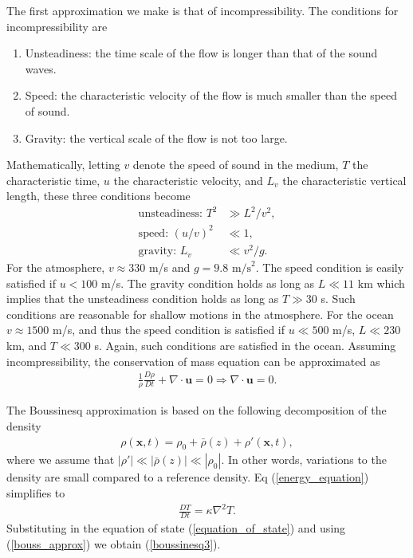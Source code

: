 The first approximation we make is that of incompressibility. The conditions for incompressibility are \cite{batchelor,kundu,waitecnotes}
\begin{enumerate}
\item Unsteadiness: the time scale of the flow is longer than that of the sound waves.
\item Speed: the characteristic velocity of the flow is much smaller than the speed of sound.
\item Gravity: the vertical scale of the flow is not too large.
\end{enumerate}
Mathematically, letting $v$ denote the speed of sound in the medium, $T$ the characteristic time, $u$ the characteristic velocity, and $L_{v}$ the characteristic vertical length, these three conditions become \cite{waitecnotes}
\begin{align}
\text{unsteadiness: } T^{2} &\gg L^{2}/v^{2},\\
\text{speed: } (u/v)^{2} &\ll 1,\\
\text{gravity: } L_{v}&\ll v^{2}/g.
\end{align} 
For the atmosphere, $v\approx 330$ m/s and $g=9.8 \text{ m/s}^{2}$. The speed condition is easily satisfied if $u< 100$ m/s. The gravity condition holds as long as $L\ll 11 \text{ km}$ which implies that the unsteadiness condition holds as long as $T\gg 30$ s. Such conditions are reasonable for shallow motions in the atmosphere. For the ocean $v\approx 1500$ m/s, and thus the speed condition is satisfied if $u\ll500$ m/s, $L\ll230$ km, and $T\ll300$ s. Again, such conditions are satisfied in the ocean. Assuming incompressibility, the conservation of mass equation can be approximated as \cite{kundu,waitecnotes}
\begin{align}
\frac{1}{\rho}\frac{D\rho}{Dt} + \nabla \cdot \bm{u}=0 \Rightarrow \nabla \cdot\bm{u}=0.
\end{align}

The Boussinesq approximation is based on the following decomposition of the density \cite{kundu,vallis}
\begin{align}
\rho(\bm{x},t) = \rho_{0} + \bar{\rho}(z) + \rho'(\bm{x},t),\label{bouss_approx}
\end{align}
where we assume that $|\rho'| \ll |\bar{\rho}(z)| \ll |\rho_{0}|$. In other words, variations to the density are small compared to a reference density.  Eq (\ref{energy_equation}) simplifies \cite{kundu,vallis} to
\begin{align}
\frac{DT}{Dt} = \kappa\nabla^{2}T.
\end{align}
Substituting in the equation of state (\ref{equation_of_state}) and using (\ref{bouss_approx}) we obtain (\ref{boussinesq3}).

